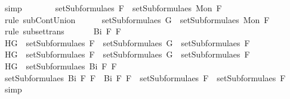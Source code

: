 \begin{isabellebody}
\ simp\isanewline
\ \ \ \ \isamarkupfalse%
\ \isamarkupfalse%
\ {}{\isacharcolon}{\isachardoublequoteopen}setSubformulae{\isacharunderscore}s\ F\ {\isasymsubseteq}\ setSubformulae{\isacharunderscore}s\ {\isacharparenleft}Mon\ F{\isacharparenright}{\isachardoublequoteclose}\ \isamarkupfalse%
\ {\isacharparenleft}rule\ subContUnion{}{\isacharparenright}\isanewline
\ \ \ \ \isamarkupfalse%
\ {\isachardoublequoteopen}setSubformulae{\isacharunderscore}s\ G\ {\isasymsubseteq}\ setSubformulae{\isacharunderscore}s\ {\isacharparenleft}Mon\ F{\isacharparenright}{\isachardoublequoteclose}\ \isamarkupfalse%
\ {}\ {}\ \isamarkupfalse%
\ {\isacharparenleft}rule\ subset{\isacharunderscore}trans{\isacharparenright}\isanewline
\ \ \isamarkupfalse%
\isanewline
{}\isamarkupfalse%
\isanewline
\ \ \isamarkupfalse%
\ {\isacharparenleft}Bi\ F{}\ F{}{\isacharparenright}\isanewline
\ \ \isamarkupfalse%
\ H{}{\isacharcolon}{\isachardoublequoteopen}G\ {\isasymin}\ setSubformulae{\isacharunderscore}s\ F{}\ {\isasymLongrightarrow}\ setSubformulae{\isacharunderscore}s\ G\ {\isasymsubseteq}\ setSubformulae{\isacharunderscore}s\ F{}{\isachardoublequoteclose}\isanewline
\ \ \isamarkupfalse%
\ H{}{\isacharcolon}{\isachardoublequoteopen}G\ {\isasymin}\ setSubformulae{\isacharunderscore}s\ F{}\ {\isasymLongrightarrow}\ setSubformulae{\isacharunderscore}s\ G\ {\isasymsubseteq}\ setSubformulae{\isacharunderscore}s\ F{}{\isachardoublequoteclose}\isanewline
\ \ \isamarkupfalse%
\ H{}{\isacharcolon}{\isachardoublequoteopen}G\ {\isasymin}\ setSubformulae{\isacharunderscore}s\ {\isacharparenleft}Bi\ F{}\ F{}{\isacharparenright}{\isachardoublequoteclose}\isanewline
\ \ \isamarkupfalse%
\ {}{\isacharcolon}{\isachardoublequoteopen}setSubformulae{\isacharunderscore}s\ {\isacharparenleft}Bi\ F{}\ F{}{\isacharparenright}\ {\isacharequal}\ {\isacharbraceleft}Bi\ F{}\ F{}{\isacharbraceright}\ {\isasymunion}\ {\isacharparenleft}setSubformulae{\isacharunderscore}s\ F{}\ {\isasymunion}\ setSubformulae{\isacharunderscore}s\ F{}{\isacharparenright}{\isachardoublequoteclose}\ \isamarkupfalse%
\ simp\isanewline
\ \ \isamarkupfalse%

\end{isabellebody}
